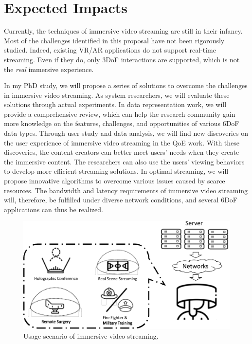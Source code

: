 \section{Expected Impacts}
Currently, the techniques of immersive video streaming are still in their infancy.
Most of the challenges identified in this proposal have not been rigorously studied.
Indeed, existing VR/AR applications do not support real-time streaming.
Even if they do, only 3DoF interactions are supported, which is not the {\em real} immersive experience.

In my PhD study, we will propose a series of solutions to overcome the challenges in immersive video streaming.
As system researchers, we will evaluate these solutions through actual experiments. 
In data representation work, we will provide a comprehensive review, 
which can help the research community gain more knowledge on the features, challenges, and opportunities of various 6DoF data types.
Through user study and data analysis, we will find new discoveries on the user experience of immersive video streaming in the QoE work.
With these discoveries, the content creators can better meet users' needs when they create the immersive content.
The researchers can also use the users' viewing behaviors to develop more efficient streaming solutions.
In optimal streaming, we will propose innovative algorithms to overcome various issues caused by scarce resources.
The bandwidth and latency requirements of immersive video streaming will, therefore, be fulfilled under diverse network conditions, and
several 6DoF applications can thus be realized.

\begin{figure}[tbh]
	\begin{center}
		\includegraphics[width=.5\textwidth]{fig/usage_scenario}
		\caption{Usage scenario of immersive video streaming.}
		\label{fig:usage_scenario}
	\end{center}
\end{figure}

